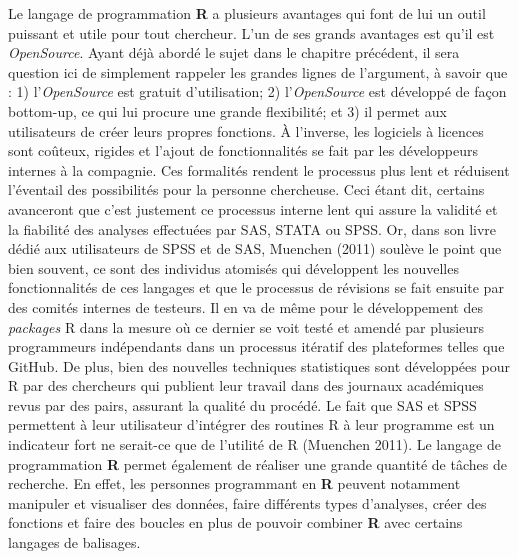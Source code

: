 \documentclass[
  letterpaper,
]{scrbook}
\begin{document}
Le langage de programmation \textbf{R} a plusieurs avantages qui font de
lui un outil puissant et utile pour tout chercheur. L'un de ses grands
avantages est qu'il est \emph{OpenSource}. Ayant déjà abordé le sujet
dans le chapitre précédent, il sera question ici de simplement rappeler
les grandes lignes de l'argument, à savoir que : 1) l'\emph{OpenSource}
est gratuit d'utilisation; 2) l'\emph{OpenSource} est développé de façon
bottom-up, ce qui lui procure une grande flexibilité; et 3) il permet
aux utilisateurs de créer leurs propres fonctions. À l'inverse, les
logiciels à licences sont coûteux, rigides et l'ajout de fonctionnalités
se fait par les développeurs internes à la compagnie. Ces formalités
rendent le processus plus lent et réduisent l'éventail des possibilités
pour la personne chercheuse. Ceci étant dit, certains avanceront que
c'est justement ce processus interne lent qui assure la validité et la
fiabilité des analyses effectuées par SAS, STATA ou SPSS. Or, dans son
livre dédié aux utilisateurs de SPSS et de SAS, Muenchen (2011) soulève
le point que bien souvent, ce sont des individus atomisés qui
développent les nouvelles fonctionnalités de ces langages et que le
processus de révisions se fait ensuite par des comités internes de
testeurs. Il en va de même pour le développement des \emph{packages} R
dans la mesure où ce dernier se voit testé et amendé par plusieurs
programmeurs indépendants dans un processus itératif des plateformes
telles que GitHub. De plus, bien des nouvelles techniques statistiques
sont développées pour R par des chercheurs qui publient leur travail
dans des journaux académiques revus par des pairs, assurant la qualité
du procédé. Le fait que SAS et SPSS permettent à leur utilisateur
d'intégrer des routines R à leur programme est un indicateur fort ne
serait-ce que de l'utilité de R (Muenchen 2011). Le langage de
programmation \textbf{R} permet également de réaliser une grande
quantité de tâches de recherche. En effet, les personnes programmant en
\textbf{R} peuvent notamment manipuler et visualiser des données, faire
différents types d'analyses, créer des fonctions et faire des boucles en
plus de pouvoir combiner \textbf{R} avec certains langages de balisages.
\end{document}
